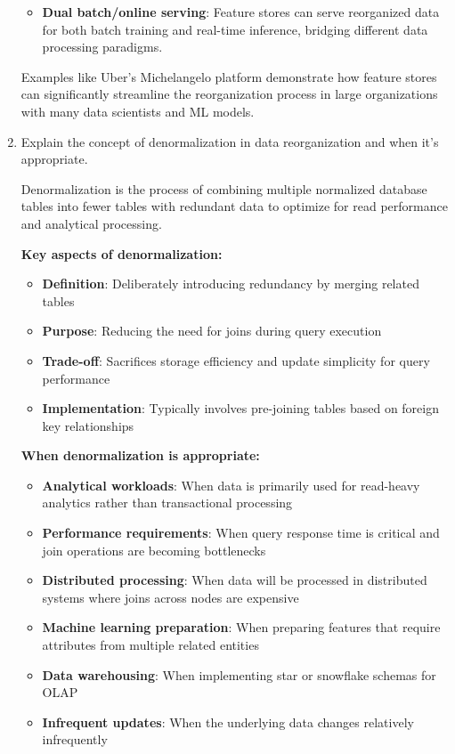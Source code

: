 \documentclass[12pt]{article}
\begin{document}
\begin{enumerate}
\begin{tcolorbox}[colback=blue!5!white,colframe=blue!75!black,title={Solution}]
\begin{itemize}
        \item \textbf{Dual batch/online serving}: Feature stores can serve reorganized data for both batch training and real-time inference, bridging different data processing paradigms.
    \end{itemize}
    
    Examples like Uber's Michelangelo platform demonstrate how feature stores can significantly streamline the reorganization process in large organizations with many data scientists and ML models.
    \end{tcolorbox}
    
    \item Explain the concept of denormalization in data reorganization and when it's appropriate.
    
    \begin{tcolorbox}[colback=blue!5!white,colframe=blue!75!black,title={Solution}]
    Denormalization is the process of combining multiple normalized database tables into fewer tables with redundant data to optimize for read performance and analytical processing.
    
    \textbf{Key aspects of denormalization:}
    \begin{itemize}
        \item \textbf{Definition}: Deliberately introducing redundancy by merging related tables
        \item \textbf{Purpose}: Reducing the need for joins during query execution
        \item \textbf{Trade-off}: Sacrifices storage efficiency and update simplicity for query performance
        \item \textbf{Implementation}: Typically involves pre-joining tables based on foreign key relationships
    \end{itemize}
    
    \textbf{When denormalization is appropriate:}
    \begin{itemize}
        \item \textbf{Analytical workloads}: When data is primarily used for read-heavy analytics rather than transactional processing
        \item \textbf{Performance requirements}: When query response time is critical and join operations are becoming bottlenecks
        \item \textbf{Distributed processing}: When data will be processed in distributed systems where joins across nodes are expensive
        \item \textbf{Machine learning preparation}: When preparing features that require attributes from multiple related entities
        \item \textbf{Data warehousing}: When implementing star or snowflake schemas for OLAP
        \item \textbf{Infrequent updates}: When the underlying data changes relatively infrequently
    \end{itemize}
    

\end{tcolorbox}
\end{enumerate}
\end{document}
